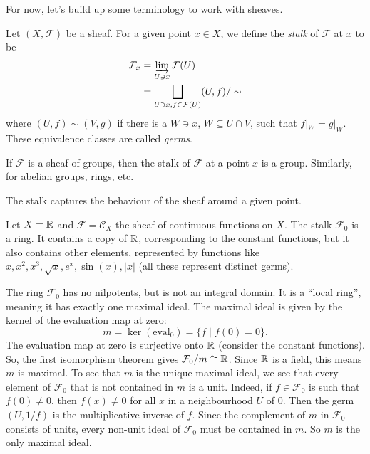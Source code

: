 For now, let's build up some terminology to work with sheaves.

\begin{definition}[Stalk]
    Let $(X, \mathcal{F})$ be a sheaf. For a given point $x \in X$, we define the \emph{stalk} of $\mathcal{F}$ at $x$ to be 
    \begin{align*}
        \mathcal{F}_x & = \varinjlim_{U \ni x} \mathcal{F}(U) \\
        & = \bigsqcup_{U \ni x, f \in \mathcal{F}(U)} (U,f) \slash \sim
    \end{align*}
    where $(U,f) \sim (V, g)$ if there is a $W \ni x$, $W \subseteq U \cap V$, such that $f|_W = g|_W$. These equivalence classes are called \emph{germs}.
  \end{definition}

  If \(\mathcal{F}\) is a sheaf of groups, then the stalk of \(\mathcal{F}\) at a point \(x\) is a group.
  Similarly, for abelian groups, rings, etc.

The stalk captures the behaviour of the sheaf around a given point. 
\begin{example}
  Let $X = \mathbb{R}$ and $\mathcal{F} = \mathcal{C}_X$ the sheaf of continuous functions on $X$.
  The stalk $\mathcal{F}_0$ is a ring.
  It contains a copy of $\mathbb{R}$, corresponding to the constant functions, but it also contains other elements, represented by functions like $x, x^2, x^3, \sqrt{x}, e^x, \sin(x), |x|$ (all these represent distinct germs).

  The ring \(\mathcal{F}_0\) has no nilpotents, but is not an integral domain.
  It is a ``local ring'', meaning it has exactly one maximal ideal.
  The maximal ideal is given by the kernel of the evaluation map at zero:
    \[
        m = \ker (\text{eval}_0) = \{f \; | \; f(0) = 0\}.
    \]
    The evaluation map at zero is surjective onto $\mathbb{R}$ (consider the constant functions).
    So, the first isomorphism theorem gives $\mathcal{F}_0 \slash m \cong \mathbb{R}$.
    Since $\mathbb{R}$ is a field, this means $m$ is maximal.
    To see that \(m\) is the unique maximal ideal, we see that every element of \(\mathcal{F}_0\) that is not contained in \(m\) is a unit.
    Indeed, if \(f \in \mathcal{F}_0\) is such that \(f(0) \neq 0\), then \(f(x) \neq 0 \) for all \(x\) in a neighbourhood \(U\) of \(0\).
    Then the germ \((U, 1/f)\) is the multiplicative inverse of \(f\).
    Since the complement of \(m\) in \(\mathcal{F}_0\) consists of units, every non-unit ideal of \(\mathcal{F}_0\) must be contained in \(m\).
    So \(m\) is the only maximal ideal.
  \end{example}
  






